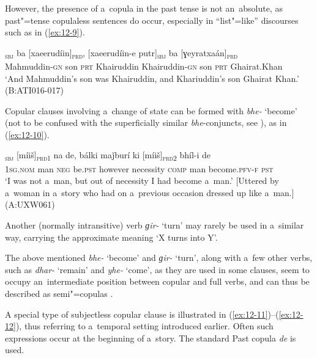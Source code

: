 However, the presence of a~copula in the past tense is not an~absolute, as past"=tense copulaless sentences do occur, especially in ``list"=like'' discourses such as in (\ref{ex:12-9}).

\begin{exe}
\ex
\label{ex:12-9}
\textsubscript{\textsc{sbj}} ba [xaeerudíin]\textsubscript{\textsc{prd}}, \textsc{[}xaeerudíin-e putr]\textsubscript{\textsc{sbj}} ba [ɣeyratxaán]\textsubscript{\textsc{prd}} \\
Mahmuddin-\textsc{gn} son \textsc{prt} Khairuddin Khairuddin-\textsc{gn} son \textsc{prt} Ghairat.Khan \\
\glt `And Mahmuddin's son was Khairuddin, and Khariuddin's son Ghairat Khan.' (B:ATI016-017)
\end{exe}

Copular clauses involving a~change of state can be formed with \textit{bhe-} `become' (not to be confused with the superficially similar \textit{bhe}-conjuncts, see ), as in (\ref{ex:12-10}).

\begin{exe}
\ex
\label{ex:12-10}
\gll [ma]\textsubscript{\textsc{sbj}} [míiš]\textsubscript{\textsc{prd1}} na de, bálki maǰburí ki [míiš]\textsubscript{\textsc{prd2}} bhíl-i de \\
\textsc{1sg.nom} man \textsc{neg} be.\textsc{pst}  however necessity \textsc{comp} man become.\textsc{pfv-f} \textsc{pst} \\
\glt `I was not a~man, but out of necessity I had become a~man.' [Uttered by a~woman in a~story who had on a~previous occasion dressed up like a~man.] (A:UXW061)
\end{exe}

Another (normally intransitive) verb \textit{ɡir-} `turn' may rarely be used in a~similar way, carrying the approximate meaning `X turns into Y'.



The above mentioned \textit{bhe-} `become' and \textit{ɡir-} `turn', along with a~few other verbs, such as \textit{dhar-} `remain' and \textit{yhe-} `come', as they are used in some clauses, seem to occupy an~intermediate position between copular and full verbs, and can thus be described as semi"=copulas \citep[5--6]{pustet2003}. 



A special type of subjectless copular clause is illustrated in (\ref{ex:12-11})--(\ref{ex:12-12}), thus referring to a~temporal setting introduced earlier. Often such expressions occur at the beginning of a~story. The standard Past copula \textit{de} is used.

